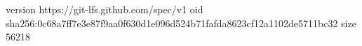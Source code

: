 version https://git-lfs.github.com/spec/v1
oid sha256:0c68a7ff7e3e87f9aa0f630d1e096d524b71fafda8623cf12a1102de5711bc32
size 56218

